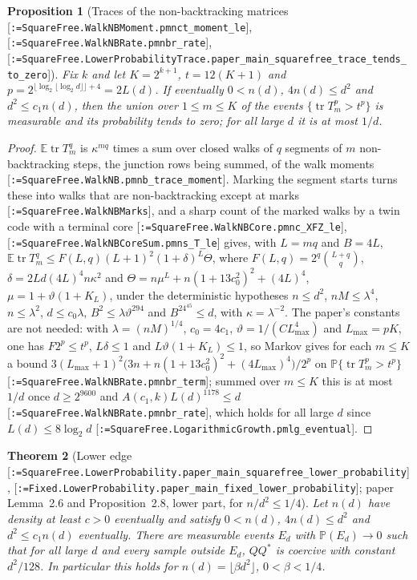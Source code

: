\documentclass[11pt]{article}
\makeatletter
\newcommand{\formal@break}[1]{\@tfor\formal@tok:=#1\do{%
  \formal@tok
  \expandafter\ifx\formal@tok.\allowbreak\else
  \expandafter\ifx\formal@tok\_\allowbreak\fi\fi}}
\DeclareRobustCommand{\formal}[1]{\textnormal{[\texttt{\small\formal@break{#1}}]}}
\newcommand{\E}{\mathbb{E}}
\newcommand{\Prob}{\mathbb{P}}
\newcommand{\tr}{\operatorname{tr}}
\theoremstyle{plain}
\newtheorem{theorem}{Theorem}[section]
\newtheorem{proposition}[theorem]{Proposition}
\theoremstyle{definition}
\makeatother
\begin{document}
\begin{proposition}[Traces of the non-backtracking matrices \formal{SquareFree.WalkNBMoment.pmnct\_moment\_le}, \formal{SquareFree.WalkNBRate.pmnbr\_rate}, \formal{SquareFree.LowerProbabilityTrace.paper\_main\_squarefree\_trace\_tends\_to\_zero}]\label{prop:nbtrace}
Fix $k$ and let $K = 2^{k+1}$, $t = 12(K+1)$ and $p = 2^{\lfloor\log_2\lfloor\log_2 d\rfloor\rfloor + 4} = 2L(d)$.
If eventually $0 < n(d)$, $4n(d) \le d^2$ and $d^2 \le c_1n(d)$, then the
union over $1 \le m \le K$ of the events $\{\tr T_m^p > t^p\}$ is measurable
and its probability tends to zero; for all large $d$ it is at most $1/d$.
\end{proposition}

\begin{proof}
$\E\tr T_{m}^{q}$ is $\kappa^{mq}$ times a sum over closed walks of $q$
segments of $m$ non-backtracking steps, the junction rows being summed, of
the walk moments \formal{SquareFree.WalkNB.pmnb\_trace\_moment}. Marking the
segment starts turns these into walks that are non-backtracking except at
marks \formal{SquareFree.WalkNBMarks}, and a sharp count of the marked
walks by a twin code with a terminal core
\formal{SquareFree.WalkNBCore.pmnc\_XFZ\_le}, \formal{SquareFree.WalkNBCoreSum.pmns\_T\_le}
gives, with $L = mq$ and $B = 4L$, $\E\tr T_m^q \le F(L, q)(L+1)^2(1 + \delta)^L\Theta$,
where $F(L, q) = 2^q\binom{L+q}{q}$, $\delta = 2Ld(4L)^4n\kappa^2$ and
$\Theta = n\mu^L + n(1 + 13c_0^2)^2 + (4L)^4$, $\mu = 1 + \vartheta(1 + K_L)$,
under the deterministic hypotheses $n \le d^2$, $nM \le \lambda^4$,
$n \le \lambda^2$, $d \le c_0\lambda$, $B^2 \le \lambda\vartheta^{294}$ and
$B^24^{45} \le d$, with $\kappa = \lambda^{-2}$. The paper's constants are
not needed: with $\lambda = (nM)^{1/4}$, $c_0 = 4c_1$,
$\vartheta = 1/(CL_{\max}^4)$ and $L_{\max} = pK$, one has
$F2^p \le t^p$, $L\delta \le 1$ and $L\vartheta(1 + K_L) \le 1$, so Markov
gives for each $m \le K$ a bound
$3(L_{\max}+1)^2\bigl(3n + n(1 + 13c_0^2)^2 + (4L_{\max})^4\bigr)/2^p$ on
$\Prob\{\tr T_m^p > t^p\}$ \formal{SquareFree.WalkNBRate.pmnbr\_term}; summed
over $m \le K$ this is at most $1/d$ once $d \ge 2^{9600}$ and
$A(c_1, k)L(d)^{1178} \le d$ \formal{SquareFree.WalkNBRate.pmnbr\_rate},
which holds for all large $d$ since $L(d) \le 8\log_2d$
\formal{SquareFree.LogarithmicGrowth.pmlg\_eventual}.
\end{proof}

\begin{theorem}[Lower edge \formal{SquareFree.LowerProbability.paper\_main\_squarefree\_lower\_probability}, \formal{Fixed.LowerProbability.paper\_main\_fixed\_lower\_probability}; paper Lemma~2.6 and Proposition~2.8, lower part, for $n/d^2 \le 1/4$]\label{thm:loweredge}
Let $n(d)$ have density at least $c > 0$ eventually and satisfy
$0 < n(d)$, $4n(d) \le d^2$ and $d^2 \le c_1n(d)$ eventually. There are
measurable events $E_d$ with $\Prob(E_d) \to 0$ such that for all large $d$
and every sample outside $E_d$, $QQ^{*}$ is coercive with constant
$d^2/128$. In particular this holds for $n(d) = \lfloor\beta d^2\rfloor$,
$0 < \beta < 1/4$.
\end{theorem}
\end{document}
